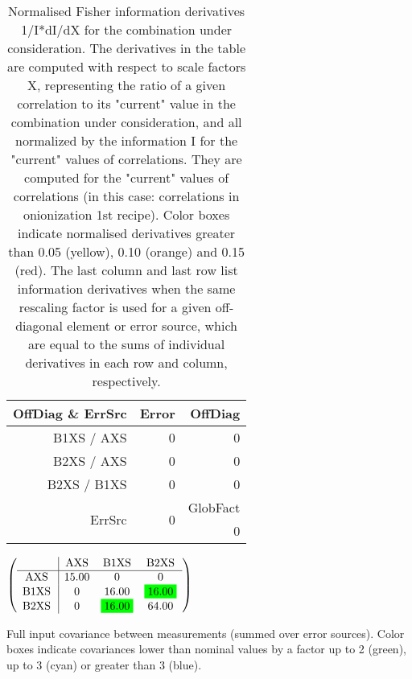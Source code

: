\begin{table}[H]
\scriptsize
\begin{center}
\renewcommand{\arraystretch}{1.1}
\begin{tabular}{|r|r|r|}
\hline
 OffDiag \& ErrSrc & {\tiny Error} & OffDiag\\
\hline
B1XS / AXS &  0 &  0 \\
B2XS / AXS &  0 &  0 \\
B2XS / B1XS &  0 &  0 \\
\hline
\multirow{2}{*}{ErrSrc} & \multirow{2}{*}{ 0} & GlobFact\\
 & &  0 \\
\hline
\end{tabular}
\renewcommand{\arraystretch}{1}
\caption{Normalised Fisher information derivatives 1/I*dI/dX for the combination under consideration. The derivatives in the table are computed with respect to scale factors X, representing the ratio of a given correlation to its "current" value in the combination under consideration, and all normalized by the information I for the "current" values of correlations. They are computed for the "current" values of correlations (in this case: correlations in onionization 1st recipe). Color boxes indicate normalised derivatives greater than 0.05 (yellow), 0.10 (orange) and 0.15 (red). The last column and last row list information derivatives when the same rescaling factor is used for a given off-diagonal element or error source, which are equal to the sums of individual derivatives in each row and column, respectively.}
\end{center}
\end{table}
\begin{table}[H]
\scriptsize
\begin{center}
\renewcommand{\arraystretch}{1.1}
\begin{math}\left(\begin{array}{c|ccc}
 & \mathrm{AXS} & 
\mathrm{B1XS} & 
\mathrm{B2XS} \\
\hline
\mathrm{AXS} \hspace*{2pt} &      15.00 &  0 &  0 \\
\mathrm{B1XS} \hspace*{2pt} &  0 &      16.00 &  \colorbox{Green1}{$     16.00$} \\
\mathrm{B2XS} \hspace*{2pt} &  0 &  \colorbox{Green1}{$     16.00$} &      64.00 \\
\end{array}\right)\end{math}
\caption{Full input covariance between measurements (summed over error sources). Color boxes indicate covariances lower than nominal values by a factor up to 2 (green), up to 3 (cyan) or greater than 3 (blue).}
\renewcommand{\arraystretch}{1}
\end{center}
\end{table}
